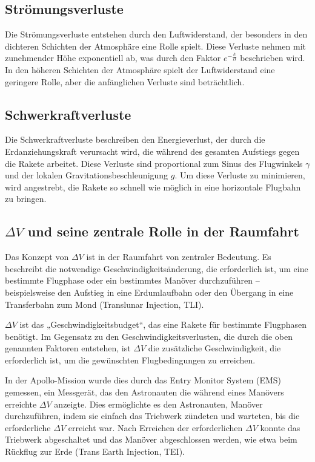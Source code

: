 \subsection{Strömungsverluste}
Die Strömungsverluste entstehen durch den Luftwiderstand, der besonders in den dichteren Schichten der Atmosphäre eine Rolle spielt. 
Diese Verluste nehmen mit zunehmender Höhe exponentiell ab, was durch den Faktor \(e^{-\frac{h}{H}}\) beschrieben wird. 
In den höheren Schichten der Atmosphäre spielt der Luftwiderstand eine geringere Rolle, aber die anfänglichen Verluste sind beträchtlich.

\subsection{Schwerkraftverluste}
Die Schwerkraftverluste beschreiben den Energieverlust, der durch die Erdanziehungskraft verursacht wird, die während des gesamten Aufstiegs gegen die Rakete arbeitet. 
Diese Verluste sind proportional zum Sinus des Flugwinkels \(\gamma\) und der lokalen Gravitationsbeschleunigung \(g\). 
Um diese Verluste zu minimieren, wird angestrebt, die Rakete so schnell wie möglich in eine horizontale Flugbahn zu bringen.

\subsection{\(\Delta V\) und seine zentrale Rolle in der Raumfahrt}
Das Konzept von \(\Delta V\) ist in der Raumfahrt von zentraler Bedeutung. 
Es beschreibt die notwendige Geschwindigkeitsänderung, die erforderlich ist, um eine bestimmte Flugphase oder ein bestimmtes Manöver durchzuführen – beispielsweise den Aufstieg in eine Erdumlaufbahn oder den Übergang in eine Transferbahn zum Mond (Translunar Injection, TLI).

\(\Delta V\) ist das „Geschwindigkeitsbudget“, das eine Rakete für bestimmte Flugphasen benötigt. 
Im Gegensatz zu den Geschwindigkeitsverlusten, die durch die oben genannten Faktoren entstehen, ist \(\Delta V\) die zusätzliche Geschwindigkeit, die erforderlich ist, um die gewünschten Flugbedingungen zu erreichen.

In der Apollo-Mission wurde dies durch das Entry Monitor System (EMS) gemessen, ein Messgerät, das den Astronauten die während eines Manövers erreichte \(\Delta V\) anzeigte. 
Dies ermöglichte es den Astronauten, Manöver durchzuführen, indem sie einfach das Triebwerk zündeten und warteten, bis die erforderliche \(\Delta V\) erreicht war. 
Nach Erreichen der erforderlichen \(\Delta V\) konnte das Triebwerk abgeschaltet und das Manöver abgeschlossen werden, wie etwa beim Rückflug zur Erde (Trans Earth Injection, TEI).

